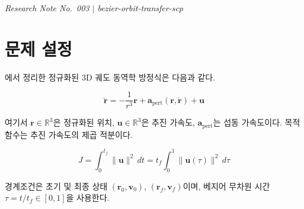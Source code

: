 \documentclass[11pt]{article}
\begin{document}
\drawborder
\thispagestyle{firstpage}


{\normalsize\textit{Research Note No.~003 $|$ bezier-orbit-transfer-scp}}\par\medskip

\def\lighterdate{March 12, 2026}


\begin{abstract}
베지어 곡선 기반 궤적최적화에서 가장 먼저 결정해야 할 사항은 어떤 물리량을 베지어 곡선으로
성형(shape)할 것인가이다.
본 보고서는 3차원 궤도전이 문제에서 가능한 성형 대상---위치, 속도, 추진 가속도---을
각각 검토하고, 목적함수의 볼록성(convexity), 경계조건 처리, 동역학 제약조건 선형화 용이성을
기준으로 비교 분석한다.
분석 결과, \textbf{추진 가속도 벡터를 베지어 곡선으로 성형}하는 방식이
이 프로젝트의 컨벡스 최적화 프레임워크에 가장 적합함을 보이고,
그 수학적 정식화를 유도한다.
\end{abstract}

\section{문제 설정}

\cite{report002}에서 정리한 정규화된 3D 궤도 동역학 방정식은 다음과 같다.

\begin{equation}
  \ddot{\mathbf{r}} = -\frac{1}{r^3}\mathbf{r} + \mathbf{a}_\mathrm{pert}(\mathbf{r}, \dot{\mathbf{r}}) + \mathbf{u}
  \label{eq:eom}
\end{equation}

여기서 $\mathbf{r} \in \mathbb{R}^3$은 정규화된 위치, $\mathbf{u} \in \mathbb{R}^3$은 추진 가속도,
$\mathbf{a}_\mathrm{pert}$는 섭동 가속도이다.
목적함수는 추진 가속도의 제곱 적분이다.

\begin{equation}
  J = \int_0^{t_f} \|\mathbf{u}\|^2 \, dt = t_f \int_0^1 \|\mathbf{u}(\tau)\|^2 \, d\tau
  \label{eq:cost}
\end{equation}

경계조건은 초기 및 최종 상태 $(\mathbf{r}_0, \mathbf{v}_0)$, $(\mathbf{r}_f, \mathbf{v}_f)$이며,
베지어 무차원 시간 $\tau = t/t_f \in [0,1]$을 사용한다.
\end{document}
